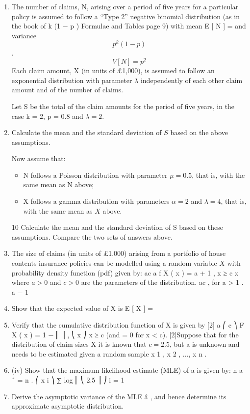 \documentclass[a4paper,12pt]{article}
\begin{document}
\begin{enumerate}
\item The number of claims, N, arising over a period of five years for a particular policy is assumed to follow a “Type 2” negative binomial distribution (as in the book of
k (1 − p )
Formulae and Tables page 9) with mean E [ N ] =
and variance
\[p^k (1 − p )\]
.
\[V [ N ] =p^2\]
Each claim amount, X (in units of £1,000), is assumed to follow an exponential distribution with parameter $\lambda$ independently of each other claim amount and of the number of claims.

Let S be the total of the claim amounts for the period of five years, in the case
k = 2, p = 0.8 and $\lambda=2$.
\item 
Calculate the mean and the standard deviation of $S$ based on the above assumptions.

Now assume that:
\begin{itemize}
\item  N follows a Poisson distribution with parameter $\mu = 0.5$, that is, with the same mean as N above;
\item  X follows a gamma distribution with parameters $\alpha = 2$ and $\lambda = 4$, that is, with the same mean as $X$ above.
\end{itemize}

10
Calculate the mean and the standard deviation of S based on these
assumptions.
Compare the two sets of answers  above.
\item The size of claims (in units of £1,000) arising from a portfolio of house contents
insurance policies can be modelled using a random variable $X$ with probability density
function (pdf) given by:
ac a
f X ( x ) = a + 1 , x ≥ c
x
where $a > 0$ and $c > 0$ are the parameters of the distribution.
ac
, for a > 1 .
a − 1
\item  Show that the expected value of X is E [ X ] =
\item  Verify that the cumulative distribution function of X is given by
[2]
a
⎛ c ⎞
F X ( x ) = 1 − ⎜ ⎟ ,
⎝ x ⎠
x ≥ c
(and = 0 for x < c).
[2]Suppose that for the distribution of claim sizes X it is known that $c = 2.5$, but a is
unknown and needs to be estimated given a random sample x 1 , x 2 , ..., x n .
\item 
(iv)
Show that the maximum likelihood estimate (MLE) of a is given by:
n
a ˆ = n
.
⎛ x i ⎞
∑ log ⎜ ⎝ 2.5 ⎟ ⎠
i = 1
\item Derive the asymptotic variance of the MLE â , and hence determine its
approximate asymptotic distribution.



\end{enumerate}
\end{document}
